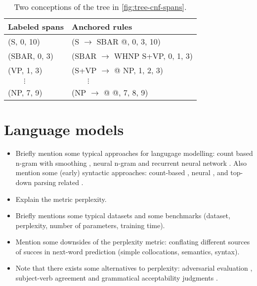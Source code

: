 \begin{table}[]
  \small
  \bgroup  %
  \def\arraystretch{1.5}  %
  \begin{tabular}{l|l}
    Labeled spans & Anchored rules \\
    \hline
    (S, 0, 10)     & (S $\to$ SBAR @, 0, 3, 10)  \\
    (SBAR, 0, 3)   & (SBAR $\to$ WHNP S+VP, 0, 1, 3)  \\
    (VP, 1, 3)     & (S+VP $\to$ @ NP, 1, 2, 3)  \\
    $\qquad\vdots$ & $\qquad\vdots$  \\
    (NP, 7, 9)     & (NP $\to$ @ @, 7, 8, 9)  \\
  \end{tabular}
  \caption{Two conceptions of the tree in \ref{fig:tree-cnf-spans}.}
  \label{tab:spans-rules}
  \egroup  %
\end{table}


\section{Language models}
\begin{itemize}
  \item Briefly mention some typical approaches for langugage modelling: count based n-gram with smoothing \citep{chen1999empirical,kneser1995improved}, neural n-gram \citep{bengio2003neural} and recurrent neural network \citep{mikolov2010recurrent}. Also mention some (early) syntactic approaches: count-based \citep{chelba2000structured,pauls2012treelets}, neural \citep{emami2005neural}, and top-down parsing related \citep{Roark2001}.
  \item Explain the metric perplexity.
  \item Briefly mentions some typical datasets and some benchmarks (dataset, perplexity, number of parameters, training time).
  \item Mention some downsides of the perplexity metric: conflating different sources of succes in next-word prediction (simple collocations, semantics, syntax).
  \item Note that there exists some alternatives to perplexity: adversarial evaluation \citep{Smith2012:adversarial}, subject-verb agreement \citep{Linzen+2016:LSTM-syntax} and grammatical acceptability judgments \citep{Linzen+2018:targeted}.
\end{itemize}


